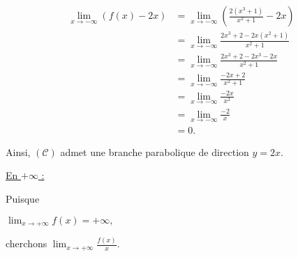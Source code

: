 \documentclass[12pt,a4paper]{article}
\begin{document}
\begin{enumerate}
\begin{enumerate}
                    \[
                        \begin{aligned}
                            \lim_{x \to -\infty} \left( f(x) - 2x \right) & = \lim_{x \to -\infty} \left( \frac{2(x^3 + 1)}{x^2 + 1} - 2x \right) \\
                                                                          & = \lim_{x \to -\infty} \frac{2x^3 + 2 - 2x(x^2 + 1)}{x^2 + 1}         \\
                                                                          & = \lim_{x \to -\infty} \frac{2x^3 + 2 - 2x^3 - 2x}{x^2 + 1}           \\
                                                                          & = \lim_{x \to -\infty} \frac{-2x + 2}{x^2 + 1}                        \\
                                                                          & = \lim_{x \to -\infty} \frac{-2x}{x^2}                                \\
                                                                          & = \lim_{x \to -\infty} \frac{-2}{x}                                   \\
                                                                          & = 0.
                        \end{aligned}
                    \]

                    Ainsi, \( (\mathcal{C}) \) admet une branche parabolique de direction \( y = 2x \).

                    \underline{En \( +\infty \) :}

                    Puisque

                    \(
                    \lim_{x \to +\infty} f(x) = +\infty,
                    \)

                    cherchons
                    \(
                    \lim_{x \to +\infty} \frac{f(x)}{x}.
                    \)


\end{enumerate}
\end{enumerate}
\end{document}
